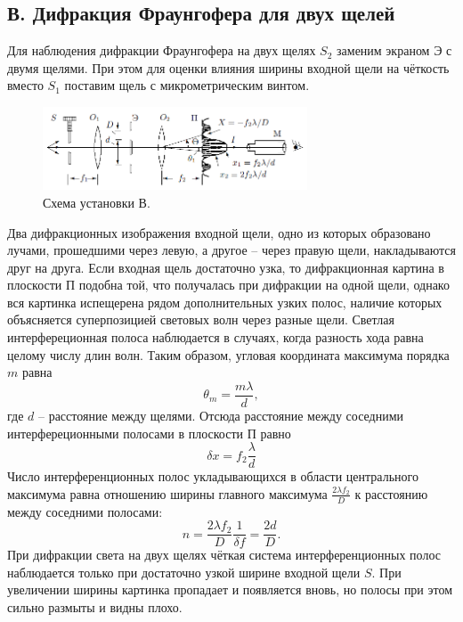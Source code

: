 \documentclass[a4paper, 12pt]{article}%
\begin{document}
	\subsection*{В. Дифракция Фраунгофера для двух щелей}
	Для наблюдения дифракции Фраунгофера на двух щелях $S_2$ заменим экраном Э с двумя щелями. При этом для оценки влияния ширины входной щели на чёткость вместо $S_1$ поставим щель с микрометрическим винтом.
	\begin{figure}[h]
		\includegraphics[width = 0.7\textwidth]{images/431-5.png}
		\centering
		\caption{Схема установки В.}
	\end{figure}
	Два дифракционных изображения входной щели, одно из которых образовано лучами, прошедшими через левую, а другое -- через правую щели, накладываются друг на друга.
	Если входная щель достаточно узка, то дифракционная картина в плоскости П подобна той, что получалась при дифракции на одной щели, однако вся картинка испещерена рядом дополнительных узких полос, наличие которых объясняется суперпозицией световых волн через разные щели. Светлая интерфереционная полоса наблюдается в случаях, когда разность хода равна целому числу длин волн. Таким образом, угловая координата максимума порядка $m$ равна
	\begin{equation}
	\theta_m = \dfrac{m \lambda}{d},
	\end{equation}
	где $d$ -- расстояние между щелями. Отсюда расстояние между соседними интерфереционными полосами в плоскости П равно
	\begin{equation}
	\delta x = f_2 \dfrac{\lambda}{d}
	\end{equation}
	Число интерференционных полос укладывающихся в области центрального максимума равна отношению ширины главного максимума $\frac{2\lambda f_2}{D}$ к расстоянию между соседними полосами:
	\begin{equation}
	n = \dfrac{2\lambda f_2}{D} \dfrac{1}{\delta f}= \dfrac{2d}{D}.
	\end{equation}
	При дифракции света на двух щелях чёткая система интерференционных полос наблюдается только при достаточно узкой ширине входной щели $S$. При увеличении ширины картинка пропадает и появляется вновь, но полосы при этом сильно размыты и видны плохо.
\end{document}
